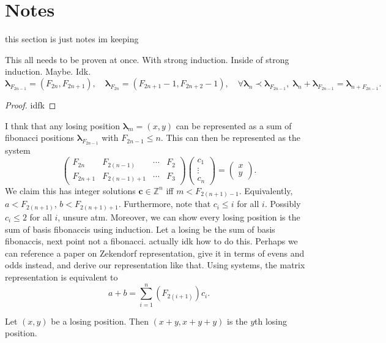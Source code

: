 \documentclass[11pt, letterpaper]{article}
\begin{document}
\section{Notes}
this section is just notes im keeping
\begin{theorem}[ksjdnfjksdn]\label{thm:kjsndkfjdn}
	This all needs to be proven at once. With strong induction. Inside of strong induction. Maybe. Idk.
	\[
		\boldsymbol{\lambda}_{F_{2n-1}}=\left( F_{2n},F_{2n+1} \right) ,\quad \boldsymbol{\lambda}_{F_{2n}}=\left( F_{2n+1}-1,F_{2n+2}-1 \right) ,\quad \forall \boldsymbol{\lambda}_n\prec\boldsymbol{\lambda}_{F_{2n-1}},\; \boldsymbol{\lambda}_n+\boldsymbol{\lambda}_{F_{2n-1}}= \boldsymbol{\lambda}_{n+F_{2n-1}}
	.\]
\end{theorem}
\begin{proof}
	idfk
\end{proof}
I thnk that any losing position $\boldsymbol{\lambda}_m=(x,y)$ can be represented as a sum of fibonacci positions $\boldsymbol{\lambda}_{F_{2n-1}}$ with $F_{2n-1}\leq n$. This can then be represented as the system
\[
	\begin{pmatrix}
		F_{2n}&F_{2(n-1)}&\cdots&F_2\\
		F_{2n+1}&F_{2(n-1)+1}&\cdots&F_{3}
	\end{pmatrix} \begin{pmatrix}
		c_1\\
		\vdots\\
		c_n
	\end{pmatrix} =\begin{pmatrix}
		x\\
		y
	\end{pmatrix} 
.\]
We claim this has integer solutions $\mathbf{c}\in\mathbb{Z}^n$ iff $m<F_{2(n+1)-1}$. Equivalently, $a<F_{2(n+1)}$, $b<F_{2(n+1)+1}$. Furthermore, note that $c_i\leq i$ for all $i$. Possibly $c_i\leq 2$ for all $i$, unsure atm. Moreover, we can show every losing position is the sum of basis fibonaccis using induction. Let a losing be the sum of basis fibonaccis, next point not a fibonacci. actually idk how to do this. Perhaps we can reference a paper on Zekendorf representation, give it in terms of evens and odds instead, and derive our representation like that. Using systems, the matrix representation is equivalent to
\[
	a+b=\sum_{i=1}^{n} \left( F_{2(i+1)} \right) c_i
.\]
\begin{theorem}\label{thm:kjsd}
	Let $(x,y)$ be a losing position. Then $(x+y,x+y+y)$ is the $y$th losing position.
\end{theorem}
\end{document}
